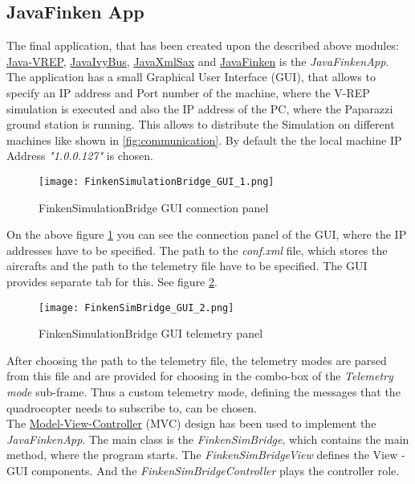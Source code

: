 \subsection{JavaFinken App}
\label{sec:javaFinkenApp}

The final application, that has been created upon the described above modules: \hyperref[sec:vrepImplementation]{Java-VREP}, \hyperref[sec:ivyBusImplementation]{JavaIvyBus}, \hyperref[sec:xmlImplementation]{JavaXmlSax} and \hyperref[sec:javaFinkenImplementation]{JavaFinken}  is the \textit{JavaFinkenApp}. The application has a small Graphical User Interface (GUI), that allows to specify an IP address and Port number of the machine, where the V-REP simulation is executed and also the IP address of the PC, where the Paparazzi ground station is running. This allows to distribute the Simulation on different machines like shown in \ref{fig:communication}.
By default the the local machine IP Address \textit{"1.0.0.127"} is chosen. 

\begin{figure}[h!]
 \begin{center}
  \texttt{[image: FinkenSimulationBridge\_GUI\_1.png]}
 \end{center}
  \caption{FinkenSimulationBridge GUI connection panel\label{fig:finkenGUI1}}
\end{figure}

On the above figure \ref{fig:finkenGUI1} you can see the connection panel of the GUI, where the IP addresses have to be specified. The path to the \textit{conf.xml} file, which stores the aircrafts and the path to the telemetry file have to be specified. The GUI provides separate tab for this. See figure \ref{fig:finkenGUI2}.

\begin{figure}[h!]
 \begin{center}
  \texttt{[image: FinkenSimBridge\_GUI\_2.png]}
 \end{center}
  \caption{FinkenSimulationBridge GUI telemetry panel\label{fig:finkenGUI2}}
\end{figure}

After choosing the path to the telemetry file, the telemetry modes are parsed from this file and are  provided for choosing in the combo-box of the \textit{Telemetry mode} sub-frame. Thus a custom telemetry mode, defining the messages that the quadrocopter needs to subscribe to, can be chosen. \\

The \href{http://www.oracle.com/technetwork/articles/javase/index-142890.html}{Model-View-Controller} (MVC) design has been used to implement the \textit{JavaFinkenApp}. The main class is the \textit{FinkenSimBridge}, which contains the main method, where the program starts. The \textit{FinkenSimBridgeView} defines the View - GUI components. And the \textit{FinkenSimBridgeController} plays the controller role. \\


